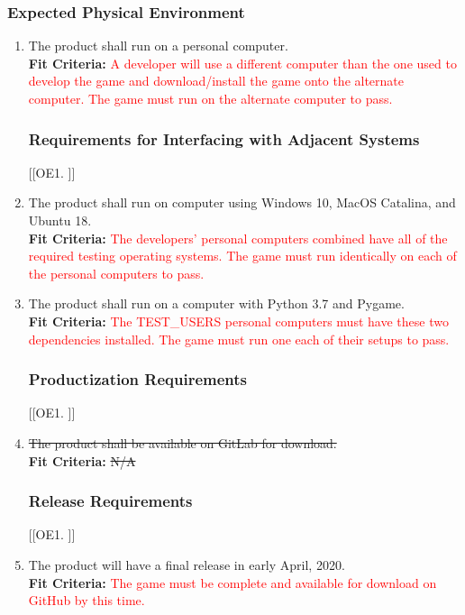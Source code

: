 \documentclass[12pt, titlepage]{article}
\begin{document}
\subsubsection{Expected Physical Environment}
\begin{enumerate}[{OE}1. ]
    \item The product shall run on a personal computer.\\
    \textbf{Fit Criteria:} \textcolor{red}{A developer will use a different computer than the one used to develop the game and download/install the game onto the alternate computer. The game must run on the alternate computer to pass.}

\subsubsection{Requirements for Interfacing with Adjacent Systems}
[{[{OE}1. ]}]
    \item The product shall run on computer using Windows 10, MacOS Catalina, and Ubuntu 18.\\
    \textbf{Fit Criteria:} \textcolor{red}{The developers' personal computers combined have all of the required testing operating systems. The game must run identically on each of the personal computers to pass.}
    \item The product shall run on a computer with Python 3.7 and Pygame.\\
    \textbf{Fit Criteria:} \textcolor{red}{The TEST\_USERS personal computers must have these two dependencies installed. The game must run one each of their setups to pass. }

\subsubsection{Productization Requirements}
[{[{OE}1. ]}]
    \item \sout{The product shall be available on GitLab for download.}\\
    \textbf{Fit Criteria:} \sout{N/A}

\subsubsection{Release Requirements}
[{[{OE}1. ]}]
    \item The product will have a final release in early April, 2020.\\
    \textbf{Fit Criteria:} \textcolor{red}{The game must be complete and available for download on GitHub by this time.}
\end{enumerate}
\end{document}
